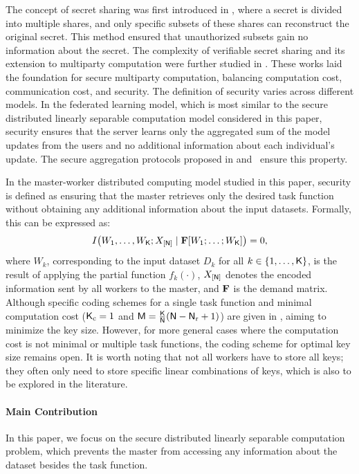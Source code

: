 \documentclass[conference,letterpaper]{IEEEtran}
\begin{document}
The concept of secret sharing was first introduced in \cite{shamir1979share}, where a secret is divided into multiple shares, and only specific subsets of these shares can reconstruct the original secret. This method ensured that unauthorized subsets gain no information about the secret. The complexity of verifiable secret sharing and its extension to multiparty computation were further studied in \cite{cramer2000complexity}. These works laid the foundation for secure multiparty computation, balancing computation cost, communication cost, and security.
The definition of security varies across different models. In the federated learning model, which is most similar to the secure distributed linearly separable computation model considered in this paper, security ensures that the server learns only the aggregated sum of the model updates from the users and no additional information about each individual’s update. The secure aggregation protocols proposed in \cite{fereidooni2021safe} and~\cite{Bonawitz_Secure_Aggregation} ensure this property.


In the master-worker distributed computing model studied in this paper, security is defined as ensuring that the master retrieves only the desired task function without obtaining any additional information about the input datasets. Formally, this can be expressed as:
\begin{align}
I\big(W_{1},\ldots, W_{{\sf K}}; X_{[{\sf N}]} \mid {\bf F} [W_1;\ldots;W_{{\sf K}}] \big) = 0, 
\end{align}
where $W_k$, corresponding to the input dataset $D_k$ for all $k \in \{1, \ldots, {\sf K}\}$, is the result of applying the partial function $f_k(\cdot)$, $X_{[{\sf N}]}$ denotes the encoded information sent by all workers to the master, and ${\bf F}$ is the demand matrix.
Although specific coding schemes for a single task function and minimal computation cost (${\sf K}_{\rm c}=1$ and ${\sf M} = \frac{{\sf K}}{{\sf N}}({\sf N} - {\sf N}_{\rm r} + 1)$) are given in \cite{wan2022secure}, aiming to minimize the key size. However, for more general cases where the computation cost is not minimal or multiple task functions, the coding scheme for optimal key size remains open. It is worth noting that not all workers have to store all keys; they often only need to store specific linear combinations of keys, which is also to be explored in the literature.

\fi

\paragraph*{Main Contribution} 
In this paper, we focus on the secure distributed linearly separable computation problem, which prevents the master from accessing any information about the dataset besides the task function. 
\end{document}

